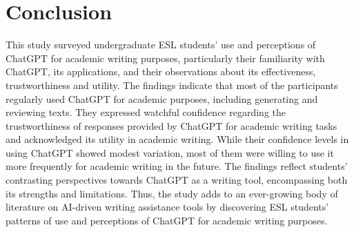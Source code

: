 \documentclass[english]{textolivre}
\begin{document}
\section{Conclusion}
This study surveyed undergraduate ESL students’ use and perceptions of ChatGPT for academic writing purposes, particularly their familiarity with ChatGPT, its applications, and their observations about its effectiveness, trustworthiness and utility. The findings indicate that most of the participants regularly used ChatGPT for academic purposes, including generating and reviewing texts. They expressed watchful confidence regarding the trustworthiness of responses provided by ChatGPT for academic writing tasks and acknowledged its utility in academic writing. While their confidence levels in using ChatGPT showed modest variation, most of them were willing to use it more frequently for academic writing in the future. The findings reflect students’ contrasting perspectives towards ChatGPT as a writing tool, encompassing both its strengths and limitations. Thus, the study adds to an ever-growing body of literature on AI-driven writing assistance tools by discovering ESL students’ patterns of use and perceptions of ChatGPT for academic writing purposes.


\printbibliography\label{sec-bib}
\end{document}
